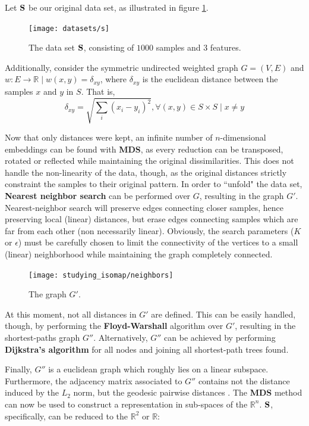 Let $\mathbf{S}$ be our original data set, as illustrated in figure \ref{fig:mani_s}.

\begin{figure}[H]
	\centering
	\captionsetup{justification=centering}
	\texttt{[image: datasets/s]}
	\caption{The data set $\mathbf{S}$, consisting of $1000$ samples and $3$ features.}
	\label{fig:mani_s}
\end{figure}

Additionally, consider the symmetric undirected weighted graph $G=(V, E)$ and $w \colon E \to \mathbb{R} \mid w(x, y) = \delta_{xy}$, where $\delta_{xy}$ is the euclidean distance between the samples $x$ and $y$ in $S$. That is,
$$\delta_{xy} = \sqrt{\sum_{i} (x_i - y_i)^2}, \forall (x, y) \in S\times S \mid x\ne y$$

Now that only distances were kept, an infinite number of $n$-dimensional embeddings can be found with \textbf{MDS}, as every reduction can be transposed, rotated or reflected while maintaining the original dissimilarities. This does not handle the non-linearity of the data, though, as the original distances strictly constraint the samples to their original pattern. In order to ``unfold" the data set, \textbf{Nearest neighbor search} can be performed over $G$, resulting in the graph $G'$. Nearest-neighbor search will preserve edges connecting closer samples, hence preserving local (linear) distances, but erase edges connecting samples which are far from each other (non necessarily linear). Obviously, the search parameters ($K$ or $\epsilon$) must be carefully chosen to limit the connectivity of the vertices to a small (linear) neighborhood while maintaining the graph completely connected.

\begin{figure}[H]
	\centering
	\captionsetup{justification=centering}
	\texttt{[image: studying\_isomap/neighbors]}
	\caption{The graph $G'$.}
	\label{fig:mani_s_graph_h}
\end{figure}

At this moment, not all distances in $G'$ are defined. This can be easily handled, though, by performing the \textbf{Floyd-Warshall} algorithm over $G'$, resulting in the shortest-paths graph $G''$. Alternatively, $G''$ can be achieved by performing \textbf{Dijkstra's algorithm} for all nodes and joining all shortest-path trees found.

Finally, $G''$ is a euclidean graph which roughly lies on a linear subspace. Furthermore, the adjacency matrix associated to $G''$ contains not the distance induced by the $L_2$ norm, but the geodesic pairwise distances \cite{gho2006}. The \textbf{MDS} method can now be used to construct a representation in sub-spaces of the $\mathbb{R}^n$. $\mathbf{S}$, specifically, can be reduced to the $\mathbb{R}^2$ or $\mathbb{R}$:

